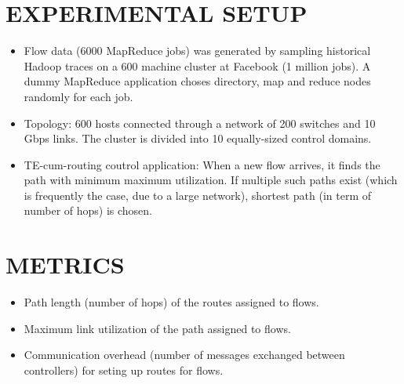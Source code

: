 \documentclass[a0,portrait]{a0poster}
\begin{document}
\begin{multicols}{2}
\section*{EXPERIMENTAL SETUP}
\color{DarkSlateGray}
\begin{itemize}
\item Flow data (6000 MapReduce jobs) was generated by sampling historical Hadoop traces on a 600 machine cluster at Facebook (1 million jobs). A dummy MapReduce application choses directory, map and reduce nodes randomly for each job.
\item Topology: 600 hosts connected through a network of 200 switches and 10 Gbps links. The cluster is divided into 10 equally-sized control domains.
\item TE-cum-routing coutrol application: When a new flow arrives, it finds the path with minimum maximum utilization. If multiple such paths exist (which is frequently the case, due to a large network), shortest path (in term of number of hops) is chosen.
\end{itemize}

\color{SaddleBrown}
\section*{METRICS}
\color{DarkSlateGray}
\begin{itemize}
\item Path length (number of hops) of the routes assigned to flows.
\item Maximum link utilization of the path assigned to flows.
\item Communication overhead (number of messages exchanged between controllers) for seting up routes for flows.   
\end{itemize}




\end{multicols}
\end{document}

